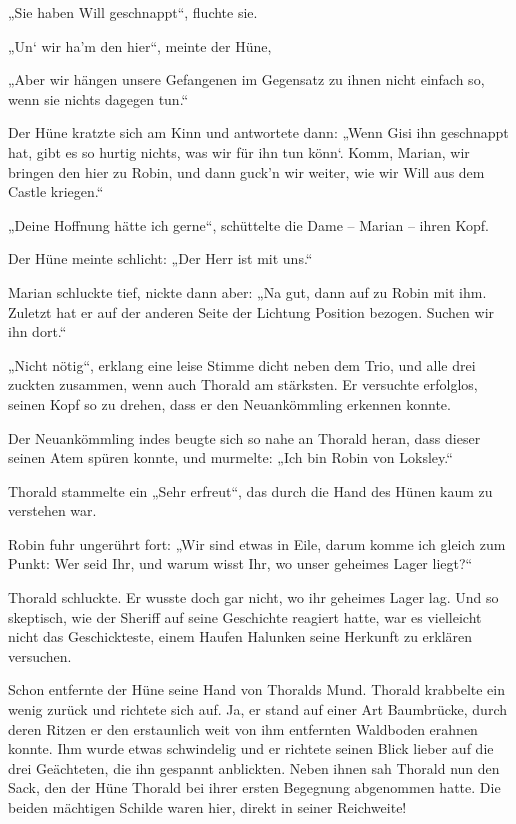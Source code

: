 „Sie haben Will geschnappt“, fluchte sie.

„Un‘ wir ha’m den hier“, meinte der Hüne,

„Aber wir hängen unsere Gefangenen im Gegensatz zu ihnen nicht einfach so, wenn sie nichts dagegen tun.“

Der Hüne kratzte sich am Kinn und antwortete dann: „Wenn Gisi ihn geschnappt hat, gibt es so hurtig nichts, was wir für ihn tun könn‘. Komm, Marian, wir bringen den hier zu Robin, und dann guck’n wir weiter, wie wir Will aus dem Castle kriegen.“

„Deine Hoffnung hätte ich gerne“, schüttelte die Dame – Marian – ihren Kopf.

Der Hüne meinte schlicht: „Der Herr ist mit uns.“

Marian schluckte tief, nickte dann aber: „Na gut, dann auf zu Robin mit ihm. Zuletzt hat er auf der anderen Seite der Lichtung Position bezogen. Suchen wir ihn dort.“

„Nicht nötig“, erklang eine leise Stimme dicht neben dem Trio, und alle drei zuckten zusammen, wenn auch Thorald am stärksten. Er versuchte erfolglos, seinen Kopf so zu drehen, dass er den Neuankömmling erkennen konnte.

Der Neuankömmling indes beugte sich so nahe an Thorald heran, dass dieser seinen Atem spüren konnte, und murmelte: „Ich bin Robin von Loksley.“

Thorald stammelte ein „Sehr erfreut“, das durch die Hand des Hünen kaum zu verstehen war.

Robin fuhr ungerührt fort: „Wir sind etwas in Eile, darum komme ich gleich zum Punkt: Wer seid Ihr, und warum wisst Ihr, wo unser geheimes Lager liegt?“

Thorald schluckte. Er wusste doch gar nicht, wo ihr geheimes Lager lag. Und so skeptisch, wie der Sheriff auf seine Geschichte reagiert hatte, war es vielleicht nicht das Geschickteste, einem Haufen Halunken seine Herkunft zu erklären versuchen.

Schon entfernte der Hüne seine Hand von Thoralds Mund. Thorald krabbelte ein wenig zurück und richtete sich auf. Ja, er stand auf einer Art Baumbrücke, durch deren Ritzen er den erstaunlich weit von ihm entfernten Waldboden erahnen konnte. Ihm wurde etwas schwindelig und er richtete seinen Blick lieber auf die drei Geächteten, die ihn gespannt anblickten. Neben ihnen sah Thorald nun den Sack, den der Hüne Thorald bei ihrer ersten Begegnung abgenommen hatte. Die beiden mächtigen Schilde waren hier, direkt in seiner Reichweite!

